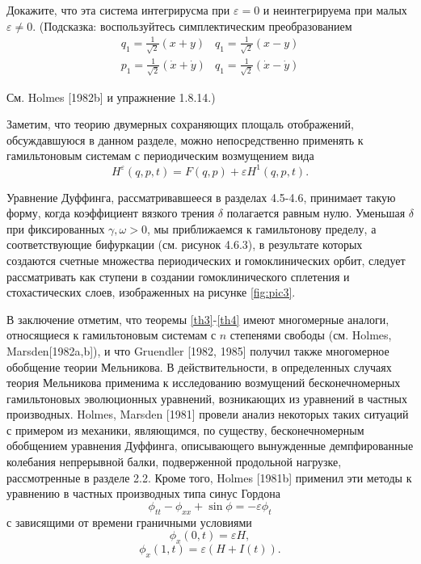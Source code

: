 \documentclass[twoside, a4paper]{article}
\begin{document}

Докажите, что эта система интегрирусма при $\varepsilon = 0$ и неинтегрируема при малых $\varepsilon \neq 0$. (Подсказка: воспользуйтесь симплектическим преобразованием
$$\begin{array}{cc}
q_1=\frac{1}{\sqrt{2}}(x+y) & q_1=\frac{1}{\sqrt{2}}(x-y)\\
p_1=\frac{1}{\sqrt{2}}(\dot x+\dot y) & q_1=\frac{1}{\sqrt{2}}(\dot x-\dot y)
\end{array}$$

См. Holmes [1982b] и упражнение 1.8.14.)

Заметим, что теорию двумерных сохраняющих площаль отображений, обсуждавшуюся в данном разделе, можно непосредственно применять к гамильтоновым системам с периодическим возмущением вида
\begin{equation}
H^\varepsilon(q,p,t)=F(q,p)+\varepsilon H^1(q,p,t).
\end{equation}

Уравнение Дуффинга, рассматривавшееся в разделах 4.5-4.6, принимает такую форму, когда коэффициент вязкого трения $\delta$ полагается равным нулю. Уменьшая $\delta$ при фиксированных $\gamma, \omega >0$, мы приближаемся к гамильтонову пределу, а соответствующие бифуркации (см. рисунок 4.6.3), в результате
которых создаются счетные множества периодических и гомоклинических орбит, следует рассматривать как ступени в создании гомоклинического сплетения и стохастических слоев, изображенных на рисунке \ref{fig:pic3}.

В заключение отметим, что теоремы \ref{th3}-\ref{th4} имеют многомерные аналоги, относящиеся к гамильтоновым системам с $n$ степенями свободы (см. Holmes, Marsden[1982a,b]), и что Gruendler [1982, 1985] получил также многомерное обобщение теории Мельникова. В действительности, в определенных случаях теория Мельникова применима к исследованию возмущений бесконечномерных гамильтоновых эволюционных уравнений, возникающих из уравнений в частных производных.  Holmes, Marsden [1981] провели анализ некоторых таких ситуаций с примером из механики, являющимся, по существу, бесконечномерным обобщением уравнения Дуффинга, описывающего вынужденные демпфированные колебания непрерывной балки, подверженной продольной нагрузке, рассмотренные в разделе 2.2. Кроме того, Holmes [1981b] применил эти методы к уравнению в частных
производных типа синус Гордона
$$\phi_{tt}-\phi_{xx}+\sin\phi=-\varepsilon\phi_t$$
с зависящими от времени граничными условиями
$$\phi_x(0,t)=\varepsilon H,$$
$$\phi_x(1,t)= \varepsilon (H+I(t)).$$
\end{document}
